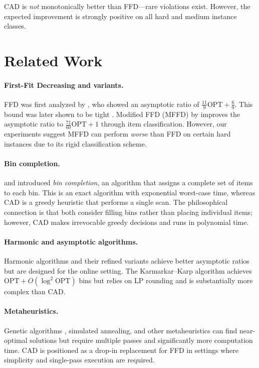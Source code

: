 \documentclass[11pt]{article}
\begin{document}
CAD is \emph{not} monotonically better than FFD---rare violations exist. However,
the expected improvement is strongly positive on all hard and medium instance classes.

\section{Related Work}

\paragraph{First-Fit Decreasing and variants.}
FFD was first analyzed by \citet{johnson1973near}, who showed an asymptotic ratio of
$\frac{11}{9}\text{OPT} + \frac{6}{9}$. This bound was later shown to be tight
\citep{dosa2007tight}. Modified FFD (MFFD) by \citet{johnson1985bin} improves the
asymptotic ratio to $\frac{71}{60}\text{OPT} + 1$ through item classification. However,
our experiments suggest MFFD can perform \emph{worse} than FFD on certain hard instances
due to its rigid classification scheme.

\paragraph{Bin completion.}
\citet{korf2002new} and \citet{fukunaga2007bin} introduced \emph{bin completion}, an
algorithm that assigns a complete set of items to each bin. This is an exact algorithm
with exponential worst-case time, whereas CAD is a greedy heuristic that performs a
single scan. The philosophical connection is that both consider filling bins rather than
placing individual items; however, CAD makes irrevocable greedy decisions and runs in
polynomial time.

\paragraph{Harmonic and asymptotic algorithms.}
Harmonic algorithms \citep{lee1985simple} and their refined variants achieve better
asymptotic ratios but are designed for the online setting. The Karmarkar--Karp
algorithm \citep{karmarkar1982efficient} achieves $\text{OPT} + O(\log^2 \text{OPT})$
bins but relies on LP rounding and is substantially more complex than CAD.

\paragraph{Metaheuristics.}
Genetic algorithms \citep{falkenauer1996hybrid}, simulated annealing, and other
metaheuristics can find near-optimal solutions but require multiple passes and
significantly more computation time. CAD is positioned as a drop-in replacement for FFD
in settings where simplicity and single-pass execution are required.
\end{document}

